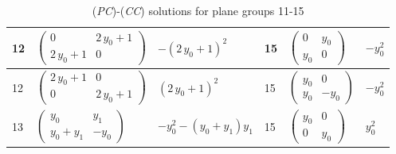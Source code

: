 \begin{table}[H]
\begin{scriptsize}
\begin{center}
\begin{tabular}{|l|l|l|l|l|l|}
12 & $\left(\begin{array}{rr}
0 & 2 \, y_{0} + 1 \\
2 \, y_{0} + 1 & 0
\end{array}\right)$ & $-{\left(2 \, y_{0} + 1\right)}^{2}$ & 15 & $\left(\begin{array}{rr}
0 & y_{0} \\
y_{0} & 0
\end{array}\right)$ & $-y_{0}^{2}$ \\ \hline
12 & $\left(\begin{array}{rr}
2 \, y_{0} + 1 & 0 \\
0 & 2 \, y_{0} + 1
\end{array}\right)$ & ${\left(2 \, y_{0} + 1\right)}^{2}$ & 15 & $\left(\begin{array}{rr}
y_{0} & 0 \\
y_{0} & -y_{0}
\end{array}\right)$ & $-y_{0}^{2}$ \\ \hline
13 & $\left(\begin{array}{rr}
y_{0} & y_{1} \\
y_{0} + y_{1} & -y_{0}
\end{array}\right)$ & $-y_{0}^{2} - {\left(y_{0} + y_{1}\right)} y_{1}$ & 15 & $\left(\begin{array}{rr}
y_{0} & 0 \\
0 & y_{0}
\end{array}\right)$ & $y_{0}^{2}$ \\ \hline
\end{tabular}
\end{center}
\caption{(\textit{PC})-(\textit{CC}) solutions for plane groups 11-15}
\label{tab:norm_dim2_15}
\end{scriptsize}
\end{table}

